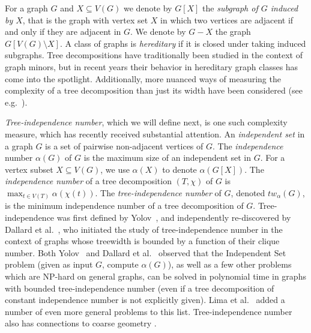 \documentclass[11pt]{amsart}
\newcommand{\atw}{tw_{\alpha}\xspace}
\begin{document}
For a graph $G$ and $X \subseteq V(G)$ we denote by $G[X]$ the {\em subgraph of $G$ induced by $X$}, that is the graph with vertex set $X$ in which two vertices are adjacent if and only if they are adjacent in $G$. We denote by $G - X$ the graph $G[V(G) \setminus X]$.  A class of graphs is {\em hereditary} if it is closed under taking induced subgraphs.
Tree decompositions have traditionally been studied in the context of graph minors, but in recent years their behavior in  hereditary graph classes has come into the spotlight. Additionally, more nuanced ways of measuring the complexity of a tree decomposition than just its width have been considered
(see e.g.~\cite{beyondTreewidthSurvey,Yolov}).
%

{\em Tree-independence number}, which we will define next,  is one such complexity measure, which has recently received substantial attention. An {\em independent set}  in a graph $G$ is a set of pairwise non-adjacent vertices of $G$. The {\em independence} number 
$\alpha(G)$ of $G$ is the maximum size of an independent set in $G$. For a vertex subset $X\subseteq V(G)$, we use $\alpha(X)$ to denote $\alpha(G[X])$.
%
%
The {\em independence number} of a tree decomposition $(T, \chi)$ of $G$ is $\max_{t \in V(T)} \alpha(\chi(t))$. The {\em tree-independence number} of $G$, denoted $\atw(G)$, is the minimum independence number of a tree decomposition of $G$.
%
Tree-independence was first defined by Yolov~\cite{Yolov}, and independently re-discovered by Dallard et al.~\cite{dms2}, who initiated the study of tree-independence number in the context of graphs whose treewidth is bounded by a function of their clique number. 
%
Both Yolov~\cite{Yolov} and  Dallard et al.~\cite{dms2} observed that the {\sc Independent Set} problem (given as input $G$, compute $\alpha(G)$), as well as a few other problems which are NP-hard on general graphs, can be solved in polynomial time in graphs with
bounded tree-independence number (even if a tree decomposition of constant independence number is not explicitly given).  Lima et al.~\cite{lima2024tree} added a number of even more general problems to this  list. Tree-independence number also has connections to coarse geometry \cite{CoarseGeoKwon, Agelos}.
\end{document}
